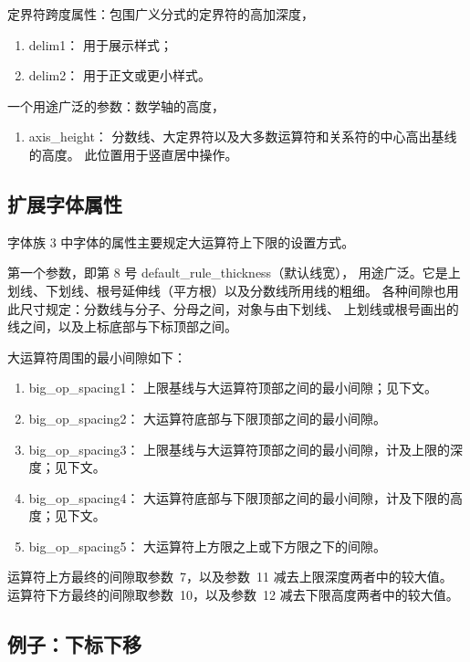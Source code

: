 \documentclass[a4paper]{rapport3}
\begin{document}
定界符跨度属性：包围广义分式的定界符的高加深度，
\begin{enumerate} %
\item delim1：
用于展示样式；
\item delim2：
用于正文或更小样式。
\end{enumerate}

一个用途广泛的参数：数学轴的高度，
\begin{enumerate} %
\item axis\_height：
分数线、大定界符以及大多数运算符和关系符的中心高出基线的高度。
此位置用于竖直居中操作。
\end{enumerate}

\subsection{扩展字体属性}

字体族 3 中字体的属性主要规定大运算符上下限的设置方式。

第一个参数，即第 8 号 default\_rule\_thickness（默认线宽），
用途广泛。它是上划线、下划线、根号延伸线（平方根）以及分数线所用线的粗细。
各种间隙也用此尺寸规定：分数线与分子、分母之间，对象与由下划线、
上划线或根号画出的线之间，以及上标底部与下标顶部之间。

大运算符周围的最小间隙如下：
\begin{enumerate} %
\item big\_op\_spacing1：
上限基线与大运算符顶部之间的最小间隙；见下文。
\item big\_op\_spacing2：
大运算符底部与下限顶部之间的最小间隙。
\item big\_op\_spacing3：
上限基线与大运算符顶部之间的最小间隙，计及上限的深度；见下文。
\item big\_op\_spacing4：
大运算符底部与下限顶部之间的最小间隙，计及下限的高度；见下文。
\item big\_op\_spacing5：
大运算符上方限之上或下方限之下的间隙。
\end{enumerate}
运算符上方最终的间隙取参数~7，以及参数~11 减去上限深度两者中的较大值。
运算符下方最终的间隙取参数~10，以及参数~12 减去下限高度两者中的较大值。

\subsection{例子：下标下移}
\end{document}
